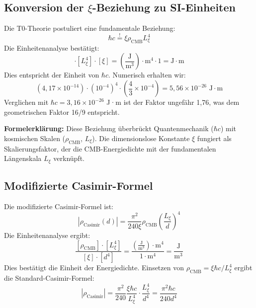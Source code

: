 	\subsection{Konversion der $\xi$-Beziehung zu SI-Einheiten}
	Die T0-Theorie postuliert eine fundamentale Beziehung:
	\begin{equation}
		\hbar c \stackrel{!}{=} \xi \rho_{\text{CMB}} L_\xi^4
	\end{equation}
	Die Einheitenanalyse bestätigt:
	\begin{equation}
		[\rho_{\text{CMB}}] \cdot [L_\xi^4] \cdot [\xi] = \left( \frac{\text{J}}{\text{m}^3} \right) \cdot \text{m}^4 \cdot 1 = \text{J} \cdot \text{m}
	\end{equation}
	Dies entspricht der Einheit von $\hbar c$. Numerisch erhalten wir:
	\begin{equation}
		\left( 4,17 \times 10^{-14} \right) \cdot \left( 10^{-4} \right)^4 \cdot \left( \frac{4}{3} \times 10^{-4} \right) = 5,56 \times 10^{-26} \text{ J} \cdot \text{m}
	\end{equation}
	Verglichen mit $\hbar c = 3,16 \times 10^{-26}$ J·m ist der Faktor ungefähr 1,76, was dem geometrischen Faktor 16/9 entspricht.
	
	\textbf{Formelerklärung:} Diese Beziehung überbrückt Quantenmechanik ($\hbar c$) mit kosmischen Skalen ($\rho_{\text{CMB}}$, $L_\xi$). Die dimensionslose Konstante $\xi$ fungiert als Skalierungsfaktor, der die CMB-Energiedichte mit der fundamentalen Längenskala $L_\xi$ verknüpft.
	
	\subsection{Modifizierte Casimir-Formel}
	Die modifizierte Casimir-Formel ist:
	\begin{equation}
		|\rho_{\text{Casimir}}(d)| = \frac{\pi^2}{240 \xi} \rho_{\text{CMB}} \left( \frac{L_\xi}{d} \right)^4
	\end{equation}
	Die Einheitenanalyse ergibt:
	\begin{equation}
		\frac{[\rho_{\text{CMB}}] \cdot [L_\xi^4]}{[\xi] \cdot [d^4]} = \frac{\left( \frac{\text{J}}{\text{m}^3} \right) \cdot \text{m}^4}{1 \cdot \text{m}^4} = \frac{\text{J}}{\text{m}^3}
	\end{equation}
	Dies bestätigt die Einheit der Energiedichte. Einsetzen von $\rho_{\text{CMB}} = \xi \hbar c / L_\xi^4$ ergibt die Standard-Casimir-Formel:
	\begin{equation}
		|\rho_{\text{Casimir}}| = \frac{\pi^2}{240} \frac{\xi \hbar c}{L_\xi^4} \cdot \frac{L_\xi^4}{d^4} = \frac{\pi^2 \hbar c}{240 d^4}
	\end{equation}
	
